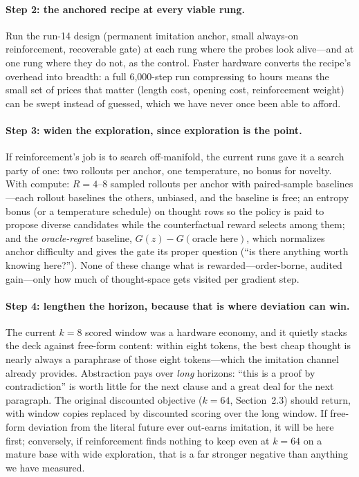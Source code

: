 \documentclass{article} %
\newcommand{\thought}{z}
\newcommand{\gain}{G}
\begin{document}
\paragraph{Step 2: the anchored recipe at every viable rung.} Run the run-14 design (permanent imitation anchor, small always-on reinforcement, recoverable gate) at each rung where the probes look alive---and at one rung where they do not, as the control. Faster hardware converts the recipe's overhead into breadth: a full 6{,}000-step run compressing to hours means the small set of prices that matter (length cost, opening cost, reinforcement weight) can be swept instead of guessed, which we have never once been able to afford.

\paragraph{Step 3: widen the exploration, since exploration is the point.} If reinforcement's job is to search off-manifold, the current runs gave it a search party of one: two rollouts per anchor, one temperature, no bonus for novelty. With compute: $R{=}4$--$8$ sampled rollouts per anchor with paired-sample baselines \citep{kool2019buy}---each rollout baselines the others, unbiased, and the baseline is free; an entropy bonus (or a temperature schedule) on thought rows so the policy is paid to propose diverse candidates while the counterfactual reward selects among them; and the \emph{oracle-regret} baseline, $\gain(\thought) - \gain(\text{oracle here})$, which normalizes anchor difficulty and gives the gate its proper question (``is there anything worth knowing here?''). None of these change what is rewarded---order-borne, audited gain---only how much of thought-space gets visited per gradient step.

\paragraph{Step 4: lengthen the horizon, because that is where deviation can win.} The current $k{=}8$ scored window was a hardware economy, and it quietly stacks the deck against free-form content: within eight tokens, the best cheap thought is nearly always a paraphrase of those eight tokens---which the imitation channel already provides. Abstraction pays over \emph{long} horizons: ``this is a proof by contradiction'' is worth little for the next clause and a great deal for the next paragraph. The original discounted objective ($k{=}64$, Section~2.3) should return, with window copies replaced by discounted scoring over the long window. If free-form deviation from the literal future ever out-earns imitation, it will be here first; conversely, if reinforcement finds nothing to keep even at $k{=}64$ on a mature base with wide exploration, that is a far stronger negative than anything we have measured.
\end{document}
